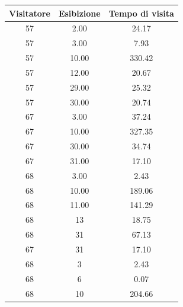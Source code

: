 \documentclass[12pt]{article}
\begin{document}
    \begin{table}[!ht]
        \centering
        \begin{tabular}{|c|c|c|}
        \hline
        \textbf{Visitatore} & \textbf{Esibizione} & \textbf{Tempo di visita} \\ \hline
        57                  & 2.00                & 24.17                    \\ \hline
        57                  & 3.00                & 7.93                     \\ \hline
        57                  & 10.00               & 330.42                   \\ \hline
        57                  & 12.00               & 20.67                    \\ \hline
        57                  & 29.00               & 25.32                    \\ \hline
        57                  & 30.00               & 20.74                    \\ \hline
        67                  & 3.00                & 37.24                    \\ \hline
        67                  & 10.00               & 327.35                   \\ \hline
        67                  & 30.00               & 34.74                    \\ \hline
        67                  & 31.00               & 17.10                    \\ \hline
        68                  & 3.00                & 2.43                     \\ \hline
        68                  & 10.00               & 189.06                   \\ \hline
        68                  & 11.00               & 141.29                   \\ \hline
        68                  & 13                  & 18.75                    \\ \hline
        68                  & 31                  & 67.13                    \\ \hline
        67                  & 31                  & 17.10                    \\ \hline
        68                  & 3                   & 2.43                     \\ \hline
        68                  & 6                   & 0.07                     \\ \hline
        68                  & 10                  & 204.66                   \\ \hline

\end{tabular}
\end{table}
\end{document}
